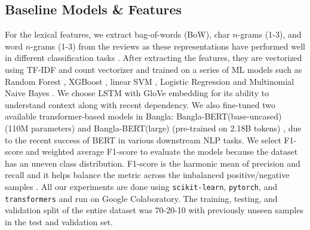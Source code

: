 \subsection{Baseline Models \& Features}
\vspace{-5pt}
For the lexical features, we extract bag-of-words (BoW), char $n$-grams (1-3), and word $n$-grams (1-3) from the reviews as these representations have performed well in different classification tasks \cite{islam2022emonoba}. After extracting the features, they are vectorized using TF-IDF and count vectorizer and trained on a series of ML models such as Random Forest \cite{RF2001RandomF}, XGBoost \cite{XGB2016XGBoostAS}, linear SVM \cite{SVM1995SupportVectorN}, Logistic Regression \cite{LR1992RidgeEI} and Multinomial Naive Bayes \cite{NB1995EstimatingCD}. We choose LSTM \cite{lstm1997LongSM} with GloVe \cite{glove2014GloVeGV} embedding for its ability to understand context along with recent dependency. We also fine-tuned two available transformer-based models in Bangla: Bangla-BERT{\selectfont (base-uncased)} (110M parameters) \citep{Sagor_2020}  and Bangla-BERT{\selectfont(large)} (pre-trained on 2.18B tokens) \citep{bhattacharjee2022banglabert}, due to the recent success of BERT \cite{Devlin2019BERTPO} in various downstream NLP tasks. We select F1-score and weighted average F1-score to evaluate the models because the dataset has an uneven class distribution. F1-score is the harmonic mean of precision and recall and it helps balance the metric across the imbalanced positive/negative samples \cite{Sokolova2006BeyondAF}. All our experiments are done using \texttt{scikit-learn}, \texttt{pytorch}, and \texttt{transformers} \cite{Vaswani2017AttentionIA} and run on Google Colaboratory. The training, testing, and validation split of the entire dataset was 70-20-10 with previously unseen samples in the test and validation set.

